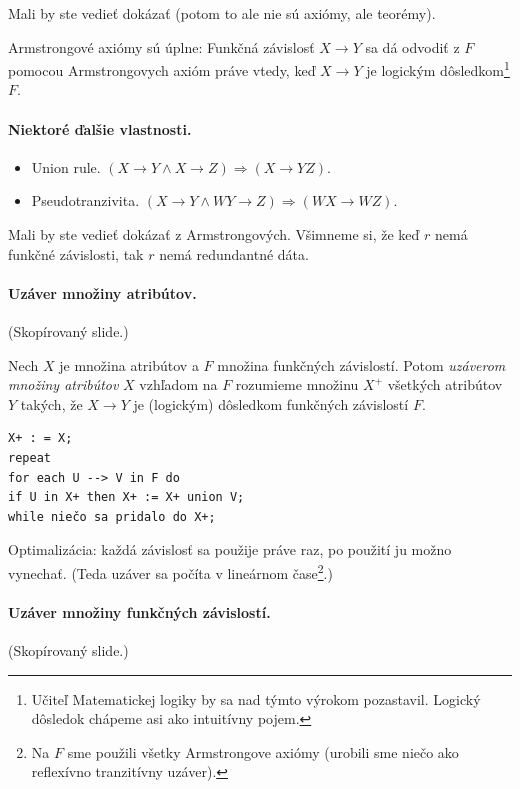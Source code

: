 \documentclass[10pt,a4paper]{article}
\begin{document}
Mali by ste vedieť dokázať (potom to ale nie sú axiómy, ale teorémy). 
 
Armstrongové axiómy sú úplne: 
Funkčná závislosť $X \rightarrow Y$ sa dá odvodiť z $F$ pomocou
Armstrongovych axióm práve vtedy, keď $X \rightarrow Y$ je logickým
dôsledkom\footnote{Učiteľ Matematickej logiky by sa nad týmto výrokom pozastavil. Logický dôsledok chápeme asi ako intuitívny pojem.} $F$.

 
\paragraph{Niektoré ďalšie vlastnosti.}
 
\begin{itemize}
\item Union rule. $(X \rightarrow Y \wedge X \rightarrow Z) \Rightarrow (X \rightarrow YZ)$.
\item Pseudotranzivita. $(X \rightarrow Y \wedge WY \rightarrow Z) \Rightarrow (WX \rightarrow WZ)$.
\end{itemize}

Mali by ste vedieť dokázať z Armstrongových.
Všimneme si, že keď $r$ nemá funkčné závislosti, tak $r$ nemá redundantné dáta.  

\paragraph{Uzáver množiny atribútov.}
(Skopírovaný slide.)

Nech $X$ je množina atribútov a $F$ množina funkčných
závislostí. Potom \emph{uzáverom množiny atribútov} $X$ vzhľadom na $F$
rozumieme množinu $X^+$ všetkých atribútov $Y$ takých, že $X \rightarrow Y$ je
(logickým) dôsledkom funkčných závislostí $F$. 
 
\begin{verbatim}
X+ : = X;
repeat
for each U --> V in F do
if U in X+ then X+ := X+ union V;
while niečo sa pridalo do X+;
\end{verbatim}

Optimalizácia: každá závislosť sa použije práve raz, po použití ju
možno vynechať. (Teda uzáver sa počíta v lineárnom čase\footnote{
Na $F$ sme použili všetky Armstrongove axiómy (urobili sme niečo ako reflexívno tranzitívny uzáver). 
}.)

\paragraph{Uzáver množiny funkčných závislostí.}
(Skopírovaný slide.)
\end{document}

